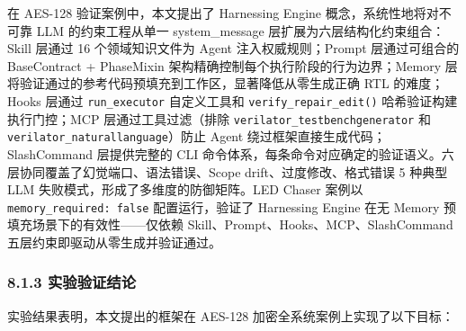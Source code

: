 在 AES-128 验证案例中，本文提出了 Harnessing Engine
概念，系统性地将对不可靠 LLM 的约束工程从单一 system\_message
层扩展为六层结构化约束组合：Skill 层通过 16 个领域知识文件为 Agent
注入权威规则；Prompt 层通过可组合的 BaseContract + PhaseMixin
架构精确控制每个执行阶段的行为边界；Memory
层将验证通过的参考代码预填充到工作区，显著降低从零生成正确 RTL
的难度；Hooks 层通过 \texttt{run\_executor} 自定义工具和
\texttt{verify\_repair\_edit()} 哈希验证构建执行门控；MCP
层通过工具过滤（排除 \texttt{verilator\_testbenchgenerator} 和
\texttt{verilator\_naturallanguage}）防止 Agent
绕过框架直接生成代码；SlashCommand 层提供完整的 CLI
命令体系，每条命令对应确定的验证语义。六层协同覆盖了幻觉端口、语法错误、Scope
drift、过度修改、格式错误 5 种典型 LLM
失败模式，形成了多维度的防御矩阵。LED Chaser 案例以
\texttt{memory\_required:\ false} 配置运行，验证了 Harnessing Engine
在无 Memory 预填充场景下的有效性------仅依赖
Skill、Prompt、Hooks、MCP、SlashCommand
五层约束即驱动从零生成并验证通过。

\subsubsection{8.1.3
实验验证结论}\label{ux5b9eux9a8cux9a8cux8bc1ux7ed3ux8bba}

实验结果表明，本文提出的框架在 AES-128 加密全系统案例上实现了以下目标：

